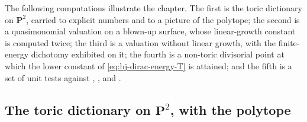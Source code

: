 The following computations illustrate the chapter.  The first is the toric dictionary on
$\mathbf P^2$, carried to explicit numbers and to a picture of the
polytope; the second is a quasimonomial valuation on a blown-up surface,
whose linear-growth constant is computed twice; the third is a valuation
without linear growth, with the finite-energy dichotomy exhibited on it;
the fourth is a non-toric divisorial point at which the lower constant of
\eqref{eq:bj-dirac-energy-T} is attained; and the fifth is a set of unit
tests against ,
,  and
.

\subsection{The toric dictionary on
\texorpdfstring{$\mathbf P^2$}{P2}, with the polytope}
\label{sec:ch49-p2}

